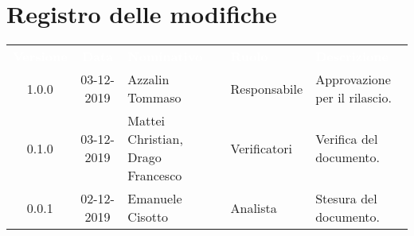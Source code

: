 \section*{Registro delle modifiche}
{
\renewcommand{\arraystretch}{1.5}
\centering
\begin{longtable}{ c c  C{4cm}  C{3cm} C{4cm}}
\textcolor{white}{\textbf{Versione}} & \textcolor{white}{\textbf{Data}} & \textcolor{white}{\textbf{Nominativo}} & \textcolor{white}{\textbf{Ruolo}} & \textcolor{white}{\textbf{Descrizione}}\\	


1.0.0 & 03-12-2019 & Azzalin Tommaso & Responsabile & Approvazione per il rilascio.  \\
		
0.1.0 & 03-12-2019 & Mattei Christian, Drago Francesco & Verificatori & Verifica del documento.  \\
		
0.0.1 & 02-12-2019 & Emanuele Cisotto & Analista & Stesura del documento.  \\
		
		
\end{longtable}
}